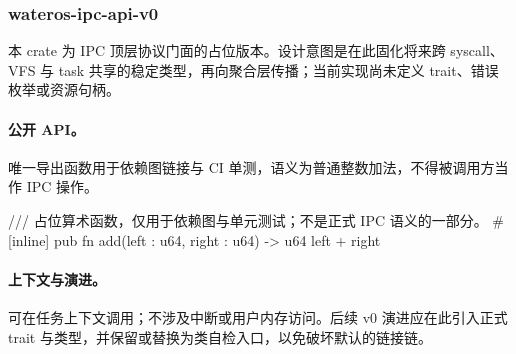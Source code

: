 
\subsubsection{wateros-ipc-api-v0}

本 crate 为 IPC 顶层协议门面的占位版本。设计意图是在此固化将来跨 syscall、VFS 与 task 共享的稳定类型，再向聚合层传播；当前实现尚未定义 trait、错误枚举或资源句柄。

\paragraph{公开 API。}
唯一导出函数用于依赖图链接与 CI 单测，语义为普通整数加法，不得被调用方当作 IPC 操作。

\begin{rustcode}
/// 占位算术函数，仅用于依赖图与单元测试；不是正式 IPC 语义的一部分。
#[inline]
pub fn add(left : u64, right : u64) -> u64 { left + right }
\end{rustcode}

\paragraph{上下文与演进。}
可在任务上下文调用；不涉及中断或用户内存访问。后续 v0 演进应在此引入正式 trait 与类型，并保留或替换为类自检入口，以免破坏默认的链接链。
